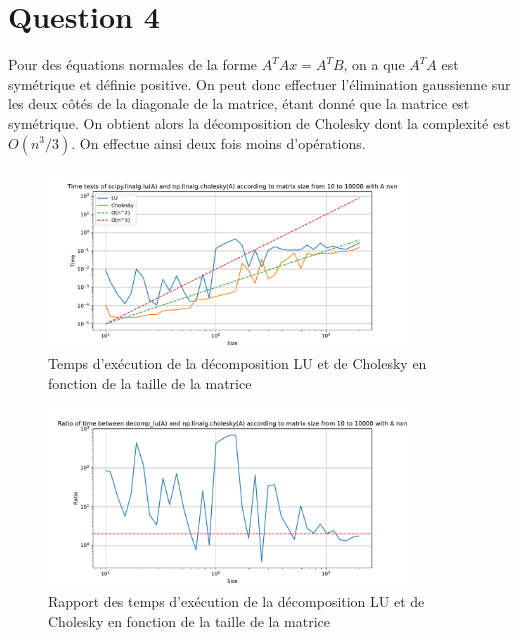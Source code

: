 \documentclass[11pt]{article}
\begin{document}
\section*{Question 4}
Pour des équations normales de la forme $A^T A x = A^T B$, on a que $A^T A$ est symétrique et définie positive. 
On peut donc effectuer l'élimination gaussienne sur les deux côtés de la diagonale de la matrice, étant donné que la matrice est symétrique.
On obtient alors la décomposition de Cholesky dont la complexité est $O(n^3/3)$. On effectue ainsi deux fois moins d'opérations.

\begin{figure}[ht]
\centering
\includegraphics[width=0.85\textwidth]{images/lu_cholesky_time_tests.pdf}
\caption{Temps d'exécution de la décomposition LU et de Cholesky en fonction de la taille de la matrice}
\end{figure}

\begin{figure}[ht]
\centering
\includegraphics[width=0.85\textwidth]{images/lu_cholesky_ratio.pdf}
\caption{Rapport des temps d'exécution de la décomposition LU et de Cholesky en fonction de la taille de la matrice}

\end{figure}
\end{document}
